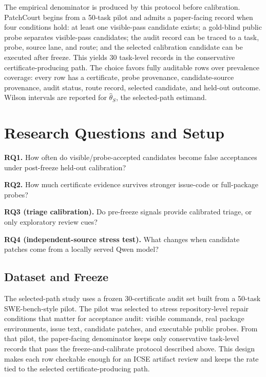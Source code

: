 \documentclass[conference]{IEEEtran}
\newcommand{\patchcourt}{PatchCourt\xspace}
\begin{document}
The empirical denominator is produced by this protocol before calibration.
\patchcourt begins from a 50-task pilot and admits a paper-facing record when four conditions hold: at least one visible-pass candidate exists; a gold-blind public probe separates visible-pass candidates; the audit record can be traced to a task, probe, source lane, and route; and the selected calibration candidate can be executed after freeze.
This yields 30 task-level records in the conservative certificate-producing path.
The choice favors fully auditable rows over prevalence coverage: every row has a certificate, probe provenance, candidate-source provenance, audit status, route record, selected candidate, and held-out outcome.
Wilson intervals are reported for $\widehat{\theta}_S$, the selected-path estimand.

\section{Research Questions and Setup}

\textbf{RQ1.} How often do visible/probe-accepted candidates become false acceptances under post-freeze held-out calibration?

\textbf{RQ2.} How much certificate evidence survives stronger issue-code or full-package probes?

\textbf{RQ3 (triage calibration).} Do pre-freeze signals provide calibrated triage, or only exploratory review cues?

\textbf{RQ4 (independent-source stress test).} What changes when candidate patches come from a locally served Qwen model?

\subsection{Dataset and Freeze}

The selected-path study uses a frozen 30-certificate audit set built from a 50-task SWE-bench-style pilot.
The pilot was selected to stress repository-level repair conditions that matter for acceptance audit: visible commands, real package environments, issue text, candidate patches, and executable public probes.
From that pilot, the paper-facing denominator keeps only conservative task-level records that pass the freeze-and-calibrate protocol described above.
This design makes each row checkable enough for an ICSE artifact review and keeps the rate tied to the selected certificate-producing path.
\end{document}
